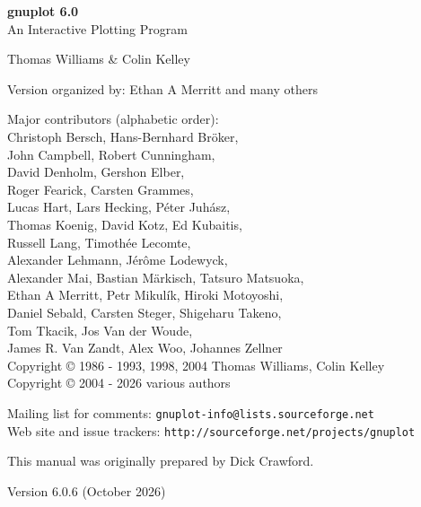 \documentclass[10pt,twoside]{article}
\def\gpVersion{6.0}
\def\gnuplotVersion{\usebox\GpVersion}
\begin{document}
\sloppy
\thispagestyle{empty}
\rule{0in}{1.0in}

  \begin{center}

  {\huge\bf {gnuplot \gpVersion}}\\
  \vspace{3ex}
  {\Large An Interactive Plotting Program}\\

  \vspace{2ex}

  \large
  Thomas Williams \& Colin Kelley\\

  \vspace{2ex}

  Version
    {\gnuplotVersion }
  organized by: Ethan A Merritt and many others\\

   \vspace{2ex}

  Major contributors (alphabetic order):\\

  Christoph Bersch,
  Hans-Bernhard Bröker,\\
  John Campbell,
  Robert Cunningham,\\
  David Denholm,
  Gershon Elber,\\
  Roger Fearick,
  Carsten Grammes,\\
  Lucas Hart,
  Lars Hecking,
  Péter Juhász,\\
  Thomas Koenig,
  David Kotz,
  Ed Kubaitis,\\
  Russell Lang,
  Timothée Lecomte,\\
  Alexander Lehmann,
  Jérôme Lodewyck,\\
  Alexander Mai,
  Bastian Märkisch,
  Tatsuro Matsuoka, \\
  Ethan A Merritt,
  Petr Mikulík,
  Hiroki Motoyoshi, \\
  Daniel Sebald,
  Carsten Steger,
  Shigeharu Takeno,\\
  Tom Tkacik,
  Jos Van der Woude,\\
  James R. Van Zandt,
  Alex Woo,
  Johannes Zellner\\
  Copyright {\copyright} 1986 - 1993, 1998, 2004   Thomas Williams, Colin Kelley\\
  Copyright {\copyright} 2004 - 2026  various authors\\

  \vspace{2ex}

  Mailing list for comments: \verb+gnuplot-info@lists.sourceforge.net+\\
  Web site and issue trackers: \verb+http://sourceforge.net/projects/gnuplot+

  \vfill
  This manual was originally prepared by Dick Crawford. \\

  \vspace{2ex}

   Version {\gpVersion{.6}} (October 2026)

   \end{center}
\newpage


\hypertarget{TableOfContents}{}
\tableofcontents

\newpage
\end{document}
